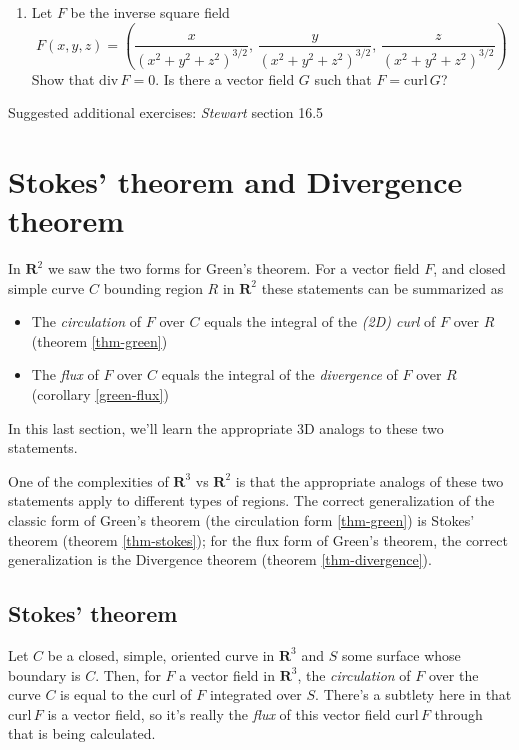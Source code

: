 \documentclass[12pt]{article}
\numberwithin{equation}{subsection}
\numberwithin{figure}{subsection}
\theoremstyle{note}
\newcommand{\curl}{\mathrm{curl\,}}
\newcommand{\dv}{\mathrm{div\,}}
\begin{document}
{\begin{enumerate}[label=\arabic*.]
\begin{enumerate}
\end{enumerate}



\item Let $F$ be the inverse square field \[ F(x,y,z)=\left( \dfrac{x}{(x^2+y^2+z^2)^{3/2}}, \,\dfrac{y}{(x^2+y^2+z^2)^{3/2}} , \,\dfrac{z}{(x^2+y^2+z^2)^{3/2}} \right) \] 
Show that $\dv F=0$. Is there a vector field $G$ such that $F=\curl G$?
\end{enumerate}
Suggested additional exercises: \textit{Stewart} section 16.5


\section[Stokes' and Divergence theorem]{Stokes' theorem and Divergence theorem}

In $\mathbf{R}^2$ we saw the two forms for Green's theorem. For a vector field $F$, and closed simple curve $C$ bounding region $R$ in $\mathbf{R}^2$ these statements can be summarized as
\begin{itemize}
	\item The \textit{circulation} of $F$ over $C$ equals the integral of the \textit{(2D) curl} of $F$ over $R$ (theorem \ref{thm-green})
	\item The \textit{flux} of $F$ over $C$ equals the integral of the \textit{divergence} of $F$ over $R$ (corollary \ref{green-flux})
\end{itemize}
In this last section, we'll learn the appropriate 3D analogs to these two statements. 

One of the complexities of $\mathbf{R}^3$ vs $\mathbf{R}^2$ is that the appropriate analogs of these two statements apply to different types of regions. The correct generalization of the classic form of Green's theorem (the circulation form \ref{thm-green}) is Stokes' theorem (theorem \ref{thm-stokes}); for the flux form of Green's theorem, the correct generalization is the Divergence theorem (theorem \ref{thm-divergence}). 

\subsection{Stokes' theorem}
Let $C$ be a closed, simple, oriented curve in $\mathbf{R}^3$ and $S$ some surface whose boundary is $C$. Then, for $F$ a vector field in $\mathbf{R}^3$, the \textit{circulation} of $F$ over the curve $C$ is equal to the curl of $F$ integrated over $S$. There's a subtlety here in that $\curl F$ is a vector field, so it's really the \textit{flux} of this vector field $\curl F$ through that is being calculated. 

}
\end{document}
